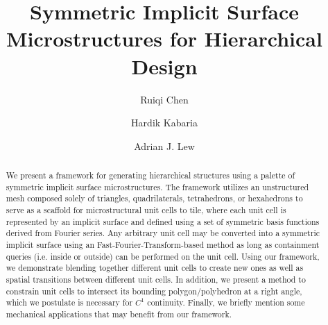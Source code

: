 \documentclass[acmtog]{acmart}
\begin{document}
\title{Symmetric Implicit Surface Microstructures for Hierarchical Design}

\author{Ruiqi Chen}
\author{Hardik Kabaria}
\author{Adrian J. Lew}

\renewcommand{\shortauthors}{Chen et al.}

\begin{abstract}
  We present a framework for generating hierarchical structures using a palette of symmetric implicit surface microstructures. The framework utilizes an unstructured mesh composed solely of triangles, quadrilaterals, tetrahedrons, or hexahedrons to serve as a scaffold for microstructural unit cells to tile, where each unit cell is represented by an implicit surface and defined using a set of symmetric basis functions derived from Fourier series. Any arbitrary unit cell may be converted into a symmetric implicit surface using an Fast-Fourier-Transform-based method as long as containment queries (i.e. inside or outside) can be performed on the unit cell. Using our framework, we demonstrate blending together different unit cells to create new ones as well as spatial transitions between different unit cells. In addition, we present a method to constrain unit cells to intersect its bounding polygon/polyhedron at a right angle, which we postulate is necessary for $C^1$ continuity. Finally, we briefly mention some mechanical applications that may benefit from our framework.
\end{abstract}
\end{document}
